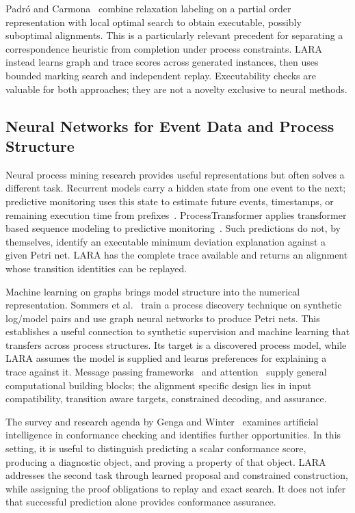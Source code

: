 Padr\'o and Carmona~\cite{Padro2022} combine relaxation labeling on a partial order representation with local optimal search to obtain executable, possibly suboptimal alignments. This is a particularly relevant precedent for separating a correspondence heuristic from completion under process constraints. LARA instead learns graph and trace scores across generated instances, then uses bounded marking search and independent replay. Executability checks are valuable for both approaches; they are not a novelty exclusive to neural methods.

\subsection{Neural Networks for Event Data and Process Structure}

Neural process mining research provides useful representations but often solves a different task. Recurrent models carry a hidden state from one event to the next; predictive monitoring uses this state to estimate future events, timestamps, or remaining execution time from prefixes~\cite{Tax2017}. ProcessTransformer applies transformer based sequence modeling to predictive monitoring~\cite{Bukhsh2021}. Such predictions do not, by themselves, identify an executable minimum deviation explanation against a given Petri net. LARA has the complete trace available and returns an alignment whose transition identities can be replayed.

Machine learning on graphs brings model structure into the numerical representation. Sommers et al.~\cite{Sommers2021} train a process discovery technique on synthetic log/model pairs and use graph neural networks to produce Petri nets. This establishes a useful connection to synthetic supervision and machine learning that transfers across process structures. Its target is a discovered process model, while LARA assumes the model is supplied and learns preferences for explaining a trace against it. Message passing frameworks~\cite{Gilmer2017} and attention~\cite{Vaswani2017} supply general computational building blocks; the alignment specific design lies in input compatibility, transition aware targets, constrained decoding, and assurance.

The survey and research agenda by Genga and Winter~\cite{Genga2025} examines artificial intelligence in conformance checking and identifies further opportunities. In this setting, it is useful to distinguish predicting a scalar conformance score, producing a diagnostic object, and proving a property of that object. LARA addresses the second task through learned proposal and constrained construction, while assigning the proof obligations to replay and exact search. It does not infer that successful prediction alone provides conformance assurance.

